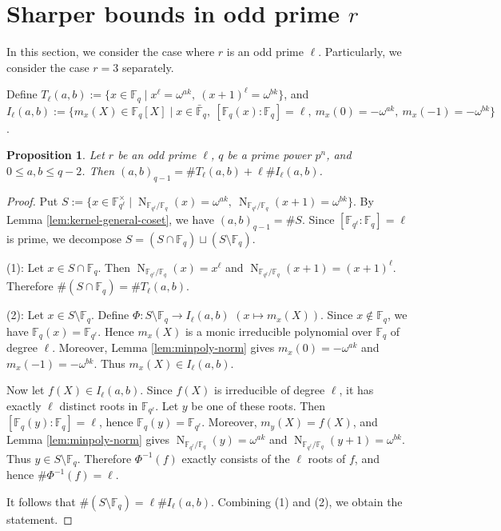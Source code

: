 \documentclass[10pt,a4paper]{article}
\newtheorem{prop}[thm]{Proposition}
\newcommand{\Norm}{\operatorname{N}}
\numberwithin{equation}{section}
\begin{document}
\section{Sharper bounds in odd prime $r$ }\label{sec:small-r}

In this section, we consider the case where $r$ is an odd prime $\ell$. Particularly,  we consider the case $r=3$ separately.


Define
$T_{\ell}(a,b):=\{x\in \mathbb{F}_q\mid x^\ell=\omega^{ak},\ (x+1)^\ell=\omega^{bk}\}$,
and
$I_{\ell}(a,b):=\{m_x(X)\in \mathbb{F}_q[X]\mid x\in \bar{\mathbb{F}}_q,\ [\mathbb{F}_q(x):\mathbb{F}_q]=\ell,\ m_x(0)=-\omega^{ak},\ m_x(-1)=-\omega^{bk}\}$.

\begin{prop}\label{prop:odd-prime-structure-general}
Let $r$ be an odd prime $\ell$, $q$ be a prime power $p^n$, and $0\le a,b\le q-2$. Then $(a,b)_{q-1}=\#T_{\ell}(a,b)+\ell \#I_{\ell}(a,b)$.
\end{prop}

\begin{proof}
Put $S:=\{x\in \mathbb{F}_{q^\ell}^\times\mid \Norm_{\mathbb{F}_{q^\ell}/\mathbb{F}_q}(x)=\omega^{ak},\ \Norm_{\mathbb{F}_{q^\ell}/\mathbb{F}_q}(x+1)=\omega^{bk}\}$. By Lemma \ref{lem:kernel-general-coset}, we have $(a,b)_{q-1}=\#S$. Since $[\mathbb{F}_{q^\ell}:\mathbb{F}_q]=\ell$ is prime, we decompose $S=(S\cap \mathbb{F}_q)\sqcup(S\setminus \mathbb{F}_q)$.

\noindent\textup{(1)}: Let $x\in S\cap \mathbb{F}_q$. Then $\Norm_{\mathbb{F}_{q^\ell}/\mathbb{F}_q}(x)=x^\ell$ and $\Norm_{\mathbb{F}_{q^\ell}/\mathbb{F}_q}(x+1)=(x+1)^\ell$. Therefore $\#(S\cap \mathbb{F}_q)=\#T_{\ell}(a,b)$.

\noindent\textup{(2)}: Let $x\in S\setminus \mathbb{F}_q$. Define $\Phi:S\setminus \mathbb{F}_q\to I_{\ell}(a,b)$ $(x\mapsto m_x(X))$. Since $x\notin \mathbb{F}_q$, we have $\mathbb{F}_q(x)=\mathbb{F}_{q^\ell}$. Hence $m_x(X)$ is a monic irreducible polynomial over $\mathbb{F}_q$ of degree $\ell$. Moreover, Lemma \ref{lem:minpoly-norm} gives $m_x(0)=-\omega^{ak}$ and $m_x(-1)=-\omega^{bk}$. Thus $m_x(X)\in I_{\ell}(a,b)$.

Now let $f(X)\in I_{\ell}(a,b)$. Since $f(X)$ is irreducible of degree $\ell$, it has exactly $\ell$ distinct roots in $\mathbb{F}_{q^\ell}$. Let $y$ be one of these roots. Then $[\mathbb{F}_q(y):\mathbb{F}_q]=\ell$, hence $\mathbb{F}_q(y)=\mathbb{F}_{q^\ell}$. Moreover, $m_y(X)=f(X)$, and Lemma \ref{lem:minpoly-norm} gives $\Norm_{\mathbb{F}_{q^\ell}/\mathbb{F}_q}(y)=\omega^{ak}$ and $\Norm_{\mathbb{F}_{q^\ell}/\mathbb{F}_q}(y+1)=\omega^{bk}$. Thus $y\in S\setminus \mathbb{F}_q$. Therefore $\Phi^{-1}(f)$ exactly consists of the $\ell$ roots of $f$, and hence $\#\Phi^{-1}(f)=\ell$.

It follows that $\#(S\setminus \mathbb{F}_q)=\ell\#I_{\ell}(a,b)$. Combining (1) and (2), we obtain the statement.
\end{proof}
\end{document}
